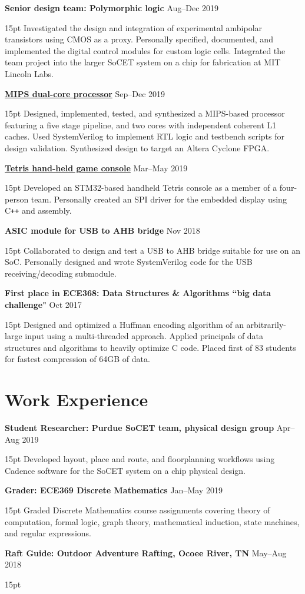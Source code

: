 \documentclass[10pt,letterpaper]{article}
\newcommand{\resumeItem}[3]{
	\textbf{#1} \hfill #2\\
	\begin{adjustwidth}{15pt}{}
	#3
	\end{adjustwidth}
}
\begin{document}
\resumeItem
{Senior design team: Polymorphic logic}
{Aug--Dec 2019}
{Investigated the design and integration of experimental ambipolar transistors using CMOS as a proxy. Personally specified, documented, and implemented the digital control modules for custom logic cells. Integrated the team project into the larger SoCET system on a chip for fabrication at MIT Lincoln Labs.}

\resumeItem
{\href{https://isaiahgrace.github.io/mips-cpu}{MIPS dual-core processor}}
{Sep--Dec 2019}
{Designed, implemented, tested, and synthesized a MIPS-based processor featuring a five stage pipeline, and two cores with independent coherent L1 caches. Used SystemVerilog to implement RTL logic and testbench scripts for design validation. Synthesized design to target an Altera Cyclone FPGA.}

\resumeItem
{\href{https://isaiahgrace.github.io/tetris}{Tetris hand-held game console}}
{Mar--May 2019}
{Developed an STM32-based handheld Tetris console as a member of a four-person team. Personally created an SPI driver for the embedded display using C\texttt{++} and assembly.}

\resumeItem
{ASIC module for USB to AHB bridge}
{Nov 2018}
{Collaborated to design and test a USB to AHB bridge suitable for use on an SoC. Personally designed and wrote SystemVerilog code for the USB receiving/decoding submodule.}

\resumeItem
{First place in ECE368: Data Structures \& Algorithms ``big data challenge"}
{Oct 2017}
{Designed and optimized a Huffman encoding algorithm of an arbitrarily-large input using a multi-threaded approach. Applied principals of data structures and algorithms to heavily optimize C code. Placed first of 83 students for fastest compression of 64GB of data.}


\section*{Work Experience}
\resumeItem
{Student Researcher: Purdue SoCET team, physical design group}
{Apr--Aug 2019}
{Developed layout, place and route, and floorplanning workflows using Cadence software for the SoCET system on a chip physical design.}

\resumeItem
{Grader: ECE369 Discrete Mathematics}
{Jan--May 2019}
{Graded Discrete Mathematics course assignments covering theory of computation, formal logic, graph theory, mathematical induction, state machines, and regular expressions.}

\resumeItem
{Raft Guide: Outdoor Adventure Rafting, Ocoee River, TN}
{May--Aug 2018}
{\vspace{-0.19in}
}
\end{document}
